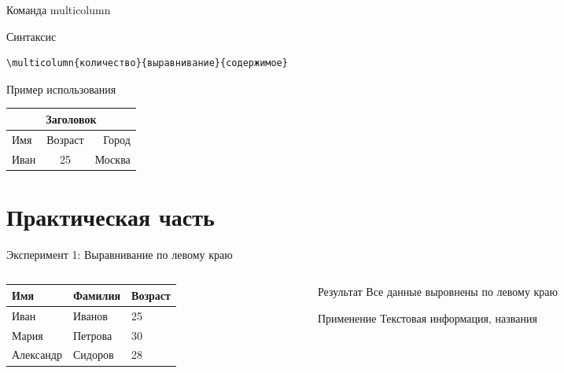 \documentclass[aspectratio=169]{beamer}
\begin{document}
\begin{frame}[fragile]{Команда multicolumn}
    \begin{block}{Синтаксис}
        \begin{verbatim}
\multicolumn{количество}{выравнивание}{содержимое}
        \end{verbatim}
    \end{block}
    
    \vspace{0.3cm}
    
    \begin{exampleblock}{Пример использования}
        \begin{center}
        \begin{tabular}{|l|c|r|}
        \hline
        \multicolumn{3}{|c|}{\textbf{Заголовок}} \\
        \hline
        Имя & Возраст & Город \\
        \hline
        Иван & 25 & Москва \\
        \hline
        \end{tabular}
        \end{center}
    \end{exampleblock}
\end{frame}

\section{Практическая часть}

\begin{frame}{Эксперимент 1: Выравнивание по левому краю}
    \begin{columns}[T]
        \begin{column}{0.6\textwidth}
            \begin{center}
            \begin{tabular}{|l|l|l|}
            \hline
            \textbf{Имя} & \textbf{Фамилия} & \textbf{Возраст} \\
            \hline
            Иван & Иванов & 25 \\
            Мария & Петрова & 30 \\
            Александр & Сидоров & 28 \\
            \hline
            \end{tabular}
            \end{center}
        \end{column}
        
        \begin{column}{0.4\textwidth}
            \begin{block}{Результат}
                Все данные выровнены по левому краю
            \end{block}
            
            \begin{alertblock}{Применение}
                Текстовая информация, названия
            \end{alertblock}
        \end{column}
    \end{columns}
\end{frame}
\end{document}
